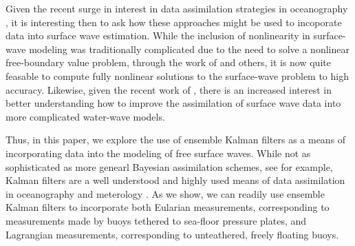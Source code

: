
Given the recent surge in interest in data assimilation strategies in oceanography \cite{jones1,jones2,apte,spiller1,spiller2}, it is interesting then to ask how these approaches might be used to incoporate data into surface wave estimation.  While the inclusion of nonlinearity in surface-wave modeling was traditionally complicated due to the need to solve a nonlinear free-boundary value problem, through the work of \cite{craig,craig2,craig3,craig4,craig5,afm} and others, it is now quite feasable to compute fully nonlinear solutions to the surface-wave problem to high accuracy.  Likewise, given the recent work of \cite{oliverasvasan}, there is an increased interest in better understanding how to improve the assimilation of surface wave data into more complicated water-wave models.  

Thus, in this paper, we explore the use of ensemble Kalman filters \cite{evensen} as a means of incorporating data into the modeling of free surface waves.  While not as sophisticated as more genearl Bayesian assimilation schemes, see \cite{apte,spiller2} for example, Kalman filters are a well understood and highly used means of data assimilation in oceanography \cite{evensen} and meterology \cite{kalnay}.  As we show, we can readily use ensemble Kalman filters to incorporate both Eularian measurements, corresponding to measurements made by buoys tethered to sea-floor pressure plates, and Lagrangian measurements, corresponding to unteathered, freely floating buoys.  

